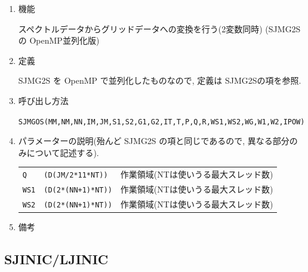 \documentclass[a4j]{jarticle}
\begin{document}
\begin{enumerate}

\item 機能 

スペクトルデータからグリッドデータへの変換を行う(2変数同時)
(SJMG2S の OpenMP並列化版)

\item 定義

SJMG2S を OpenMP で並列化したものなので, 定義は SJMG2Sの項を参照.

\item 呼び出し方法

{\tt SJMGOS(MM,NM,NN,IM,JM,S1,S2,G1,G2,IT,T,P,Q,R,WS1,WS2,WG,W1,W2,IPOW)}
  
\item パラメーターの説明(殆んど SJMG2S の項と同じであるので,
異なる部分のみについて記述する).

\begin{tabular}{lll}
{\tt Q} & {\tt (D(JM/2*11*NT))} & 作業領域(NTは使いうる最大スレッド数)\\
{\tt WS1} & {\tt (D(2*(NN+1)*NT))} & 作業領域(NTは使いうる最大スレッド数)\\
{\tt WS2} & {\tt (D(2*(NN+1)*NT))} & 作業領域(NTは使いうる最大スレッド数)
\end{tabular}

\item 備考

\end{enumerate}


\subsection{SJINIC/LJINIC}
\end{document}
